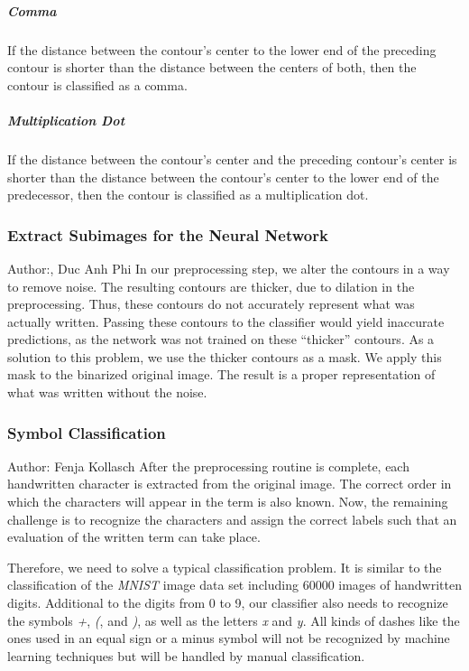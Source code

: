 \documentclass[12pt]{article}
\begin{document}
	\subparagraph{Comma}
	If the distance between the contour's center to the lower end of the preceding contour is shorter than the distance between the centers of both, then the contour is classified as a comma.\\
	
	\subparagraph{Multiplication Dot}
	If the distance between the contour's center and the preceding contour's center is shorter than the distance between the contour's center to the lower end of the predecessor, then the contour is classified as a multiplication dot.\\

\subsubsection{Extract Subimages for the Neural Network}
\small{Author:, Duc Anh Phi} \newline \newline
In our preprocessing step, we alter the contours in a way to remove noise. The resulting contours are thicker, due to dilation in the preprocessing. Thus, these contours do not accurately represent what was actually written. Passing these contours to the classifier would yield inaccurate predictions, as the network was not trained on these “thicker” contours.
As a solution to this problem, we use the thicker contours as a mask. We apply this mask to the binarized original image. The result is a proper representation of what was written without the noise.
\subsubsection{Symbol Classification}
\small{Author: Fenja Kollasch} \newline \newline
After the preprocessing routine is complete, each handwritten character is extracted from the original image. The correct order in which the characters will appear in the term is also known. Now, the remaining challenge is to recognize the characters and assign the correct labels such that an evaluation of the written term can take place.
	
	Therefore, we need to solve a typical classification problem. It is similar to the classification of the \textit{MNIST} image data set including 60000 images of handwritten digits. Additional to the digits from 0 to 9, our classifier also needs to recognize the symbols \textit{+}, \textit{(}, and \textit{)}, as well as the letters \textit{x} and \textit{y}. All kinds of dashes like the ones used in an equal sign or a minus symbol will not be recognized by machine learning techniques but will be handled by manual classification.
	
\end{document}
